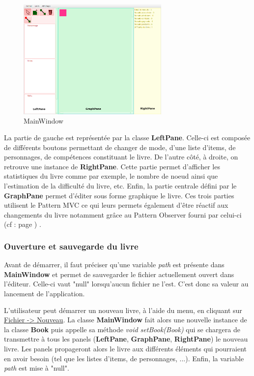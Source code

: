 			\begin{figure}[H]
				\centering\includegraphics[width=0.66\textwidth]{img/mainwindow.png}
				\caption{MainWindow}
				\label{fig:MainWindow}
			\end{figure}

			La partie de gauche est représentée par la classe \textbf{LeftPane}. Celle-ci est composée de différents boutons permettant de changer de mode, d'une liste d'items, de personnages, de compétences constituant le livre. De l'autre côté, à droite, on retrouve une instance de \textbf{RightPane}. Cette partie permet d'afficher les statistiques du livre comme par exemple, le nombre de noeud ainsi que l'estimation de la difficulté du livre, etc. Enfin, la partie centrale défini par le \textbf{GraphPane} permet d'éditer sous forme graphique le livre. Ces trois parties utilisent le Pattern MVC ce qui leurs permets également d'être réactif aux changements du livre notamment grâce au Pattern Observer fourni par celui-ci (cf :  page \pageref{subsec:pattern_observer}) .

			\subsubsection{Ouverture et sauvegarde du livre}

				Avant de démarrer, il faut préciser qu'une variable \textit{path} est présente dans \textbf{MainWindow} et permet de sauvegarder le fichier actuellement ouvert dans l'éditeur. Celle-ci vaut "null" lorsqu'aucun fichier ne l'est. C'est donc sa valeur au lancement de l'application.

				L'utilisateur peut démarrer un nouveau livre, à l'aide du menu, en cliquant sur \underline{Fichier -> Nouveau}. La classe \textbf{MainWindow} fait alors une nouvelle instance de la classe \textbf{Book} puis appelle sa méthode \textit{void setBook(Book)} qui se chargera de transmettre à tous les panels (\textbf{LeftPane}, \textbf{GraphPane}, \textbf{RightPane}) le nouveau livre. Les panels propageront alors le livre aux différents éléments qui pourraient en avoir besoin (tel que les listes d'items, de personnages, ...). Enfin, la variable \textit{path} est mise à "null".

